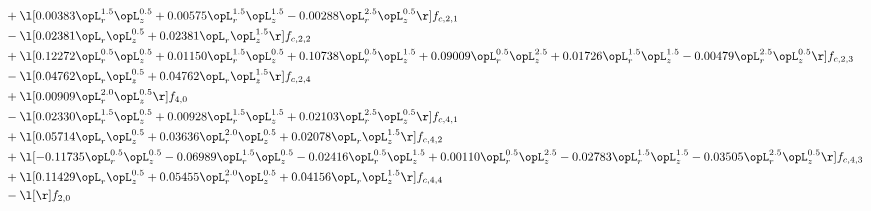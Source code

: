 \begin{alignat}{2}
& + \l[  0.00383 \opL_r^{1.5} \opL_z^{0.5} +  0.00575 \opL_r^{1.5} \opL_z^{1.5}   -0.00288 \opL_r^{2.5} \opL_z^{0.5}  \r] f_{c,2,1} \nonumber \\ 
& - \l[  0.02381 \opL_r \opL_z^{0.5} +  0.02381 \opL_r \opL_z^{1.5}  \r] f_{c,2,2} \nonumber \\ 
& + \l[  0.12272 \opL_r^{0.5} \opL_z^{0.5} +  0.01150 \opL_r^{1.5} \opL_z^{0.5} +  0.10738 \opL_r^{0.5} \opL_z^{1.5} +  0.09009 \opL_r^{0.5} \opL_z^{2.5} +  0.01726 \opL_r^{1.5} \opL_z^{1.5}   -0.00479 \opL_r^{2.5} \opL_z^{0.5}  \r] f_{c,2,3} \nonumber \\ 
& - \l[  0.04762 \opL_r \opL_z^{0.5} +  0.04762 \opL_r \opL_z^{1.5}  \r] f_{c,2,4} \nonumber \\ 
& + \l[  0.00909 \opL_r^{2.0} \opL_z^{0.5}  \r] f_{4,0} \nonumber \\ 
& - \l[  0.02330 \opL_r^{1.5} \opL_z^{0.5} +  0.00928 \opL_r^{1.5} \opL_z^{1.5} +  0.02103 \opL_r^{2.5} \opL_z^{0.5}  \r] f_{c,4,1} \nonumber \\ 
& + \l[  0.05714 \opL_r \opL_z^{0.5} +  0.03636 \opL_r^{2.0} \opL_z^{0.5} +  0.02078 \opL_r \opL_z^{1.5}  \r] f_{c,4,2} \nonumber \\ 
& + \l[  -0.11735 \opL_r^{0.5} \opL_z^{0.5}   -0.06989 \opL_r^{1.5} \opL_z^{0.5}   -0.02416 \opL_r^{0.5} \opL_z^{1.5} +  0.00110 \opL_r^{0.5} \opL_z^{2.5}   -0.02783 \opL_r^{1.5} \opL_z^{1.5}   -0.03505 \opL_r^{2.5} \opL_z^{0.5}  \r] f_{c,4,3} \nonumber \\ 
& + \l[  0.11429 \opL_r \opL_z^{0.5} +  0.05455 \opL_r^{2.0} \opL_z^{0.5} +  0.04156 \opL_r \opL_z^{1.5}  \r] f_{c,4,4} \nonumber \\ 
& - \l[  \r] f_{2,0} \nonumber \\ 
\end{alignat} 


